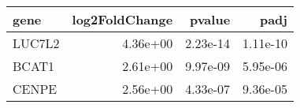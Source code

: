 \begin{tabular}{lrrr}
\toprule
  gene &  log2FoldChange &   pvalue &     padj \\
\midrule
LUC7L2 &        4.36e+00 & 2.23e-14 & 1.11e-10 \\
 BCAT1 &        2.61e+00 & 9.97e-09 & 5.95e-06 \\
 CENPE &        2.56e+00 & 4.33e-07 & 9.36e-05 \\
\bottomrule
\end{tabular}
